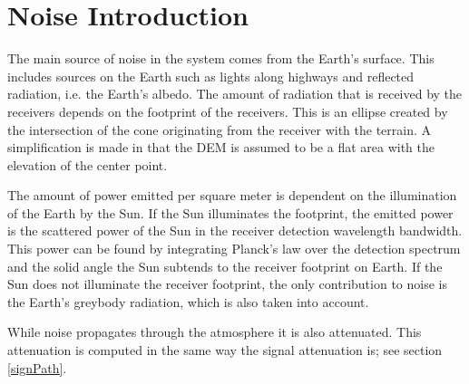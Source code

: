 \section{Noise Introduction}
\label{noise}

The main source of noise in the system comes from the Earth's surface. This includes sources on
the Earth such as lights along highways and reflected radiation, i.e. the Earth's albedo. The amount of
radiation that is received by the receivers depends on the footprint of the  receivers. This is an
ellipse created by the intersection of the cone originating from the receiver with the terrain. A
simplification is made in that the \ac{DEM} is assumed to be a flat area with the elevation of the
center point.
 
The amount of power emitted per square meter is dependent on the illumination of the Earth by the Sun. If the Sun
illuminates the footprint, the emitted power is the scattered power of the Sun in the receiver
detection wavelength bandwidth. This power can be found by integrating Planck's law over the detection spectrum and the solid angle the Sun subtends to the receiver footprint on Earth. If the Sun does not
illuminate the receiver footprint, the only contribution to noise is the Earth's greybody radiation, which is also taken into account.

While noise propagates through the atmosphere it is also attenuated. This attenuation is
computed in the same way the signal attenuation is; see section \ref{signPath}.
